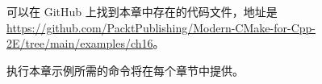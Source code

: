 
可以在 GitHub 上找到本章中存在的代码文件，地址是 \url{https://github.com/PacktPublishing/Modern-CMake-for-Cpp-2E/tree/main/examples/ch16}。

执行本章示例所需的命令将在每个章节中提供。